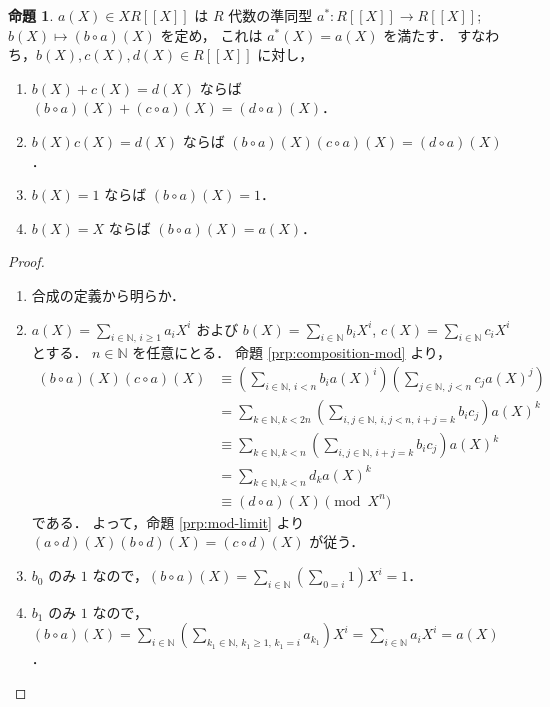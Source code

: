 \documentclass{jsarticle}
\newcommand{\N}{\mathbb{N}}
\newcommand{\longto}{\longrightarrow}
\theoremstyle{definition}
\newtheorem{Prp}{命題}
\newenvironment{prp}{\vspace{1ex}\begin{screen}\begin{Prp}}{\end{Prp}\end{screen}}
\newenvironment{prf}{\begin{leftbar}\begin{proof}}{\end{proof}\end{leftbar}}
\begin{document}
\begin{prp}
  \label{prp:composition-hom}
  $a(X) \in X R[[X]]$ は $R$ 代数の準同型 $a^*\colon R[[X]] \longto R[[X]]$; $b(X) \longmapsto (b \circ a)(X)$ を定め，
  これは $a^*(X) = a(X)$ を満たす．
  すなわち，$b(X), c(X), d(X) \in R[[X]]$ に対し，
  \begin{enumerate}[(1)]
    \item $b(X) + c(X) = d(X)$ ならば $(b \circ a)(X) + (c \circ a)(X) = (d \circ a)(X)$．
    \item $b(X) c(X) = d(X)$ ならば $(b \circ a)(X) (c \circ a)(X) = (d \circ a)(X)$．
    \item $b(X) = 1$ ならば $(b \circ a)(X) = 1$．
    \item $b(X) = X$ ならば $(b \circ a)(X) = a(X)$．
  \end{enumerate}
\end{prp}

\begin{prf}
  \begin{enumerate}[(1)]
    \item 合成の定義から明らか．
    \item $a(X) = \sum_{i\in\N,\,i\ge 1} a_i X^i$ および $b(X) = \sum_{i\in\N} b_i X^i$, $c(X) = \sum_{i\in\N} c_i X^i$ とする．
        $n \in \N$ を任意にとる．
        命題 \ref{prp:composition-mod} より，
        \begin{align*}
          (b \circ a)(X) (c \circ a)(X)
          &\equiv \left( \sum_{i\in\N,\,i<n} b_i a(X)^i \right) \left( \sum_{j\in\N,\,j<n} c_j a(X)^j \right) \\
          &= \sum_{k\in\N,k<2n} \left( \sum_{i,j\in\N,\,i,j<n,\,i+j=k} b_i c_j \right) a(X)^k \\
          &\equiv \sum_{k\in\N,k<n} \left( \sum_{i,j\in\N,\,i+j=k} b_i c_j \right) a(X)^k \\
          &= \sum_{k\in\N,k<n} d_k a(X)^k \\
          &\equiv (d \circ a)(X) \pmod{X^n}
        \end{align*}
        である．
        よって，命題 \ref{prp:mod-limit} より $(a \circ d)(X) (b \circ d)(X) = (c \circ d)(X)$ が従う．
    \item $b_0$ のみ $1$ なので，$(b \circ a)(X) = \sum_{i\in\N} \left( \sum_{0=i} 1 \right) X^i = 1$．
    \item $b_1$ のみ $1$ なので，$(b \circ a)(X) = \sum_{i\in\N} \left( \sum_{k_1\in\N,\,k_1\ge 1,\,k_1=i} a_{k_1} \right) X^i = \sum_{i\in\N} a_i X^i = a(X)$．
  \end{enumerate}
\end{prf}
\end{document}
